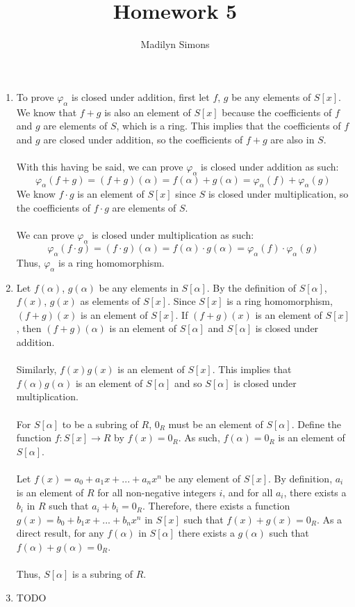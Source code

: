 \documentclass{article}
\title{Homework 5}
\author{Madilyn Simons}
\date{}
\begin{document}
\maketitle

\begin{enumerate}

\item To prove $\varphi_{\alpha}$ is closed under addition, first let $f$, $g$
be any elements of $S[x]$.  We know that $f+g$ is also an element of
$S[x]$ because the coefficients of $f$ and $g$ are elements of $S$, which is a
ring.  This implies that the coefficients of $f$ and $g$ are closed under
addition, so the coefficients of $f+g$ are also in $S$.
\\ \\
With this having be said, we can prove $\varphi_{\alpha}$ is closed under addition
as such:
\[
\varphi_{\alpha}(f+g) = (f+g)(\alpha) = f(\alpha) + g(\alpha)
= \varphi_{\alpha}(f) + \varphi_{\alpha}(g)
\]
We know $f \cdot g$ is an element of $S[x]$ since $S$ is closed under multiplication,
so the coefficients of $f \cdot g$ are elements of $S$.
\\ \\
We can prove $\varphi_{\alpha}$ is closed under multiplication as such:
\[
\varphi_{\alpha}(f \cdot g) = (f \cdot g)(\alpha) = f(\alpha) \cdot g(\alpha)
= \varphi_{\alpha}(f) \cdot \varphi_{\alpha}(g)
\]
Thus, $\varphi_{\alpha}$ is a ring homomorphism.

\item Let $f(\alpha)$, $g(\alpha)$ be any elements in $S[\alpha]$.  By the
definition of $S[\alpha]$, $f(x)$, $g(x)$ as elements of $S[x]$.  Since $S[x]$
is a ring homomorphism, $(f+g)(x)$ is an element of $S[x]$.  If $(f+g)(x)$ is an
element of $S[x]$, then $(f+g)(\alpha)$ is an element of $S[\alpha]$ and
$S[\alpha]$ is closed under addition.
\\
\\
Similarly, $f(x)g(x)$ is an element of $S[x]$.  This implies that
$f(\alpha)g(\alpha)$ is an element of $S[\alpha]$ and so $S[\alpha]$ is
closed under multiplication.
\\
\\
For $S[\alpha]$ to be a subring of $R$, $0_R$ must be an element of $S[\alpha]$.
Define the function $f:S[x] \rightarrow R$ by $f(x) = 0_R$.  As such,
$f(\alpha) = 0_R$ is an element of $S[\alpha]$.
\\
\\
Let $f(x) = a_0 + a_{1}x + ... + a_{n}x^n$ be any element of $S[x]$.
By definition, $a_i$ is an element of $R$ for all non-negative integers $i$, and
for all $a_i$, there exists a $b_i$ in $R$ such that $a_i + b_i = 0_R$.
Therefore, there exists a function $g(x) = b_0 + b_{1}x + ... + b_{n}x^n$ in
$S[x]$ such that $f(x) + g(x) = 0_R$.  As a direct result, for any $f(\alpha)$
in $S[\alpha]$ there exists a $g(\alpha)$ such that
$f(\alpha) + g(\alpha) = 0_R$.
\\
\\
Thus, $S[\alpha]$ is a subring of $R$.

\item TODO

\end{enumerate}
\end{document}
